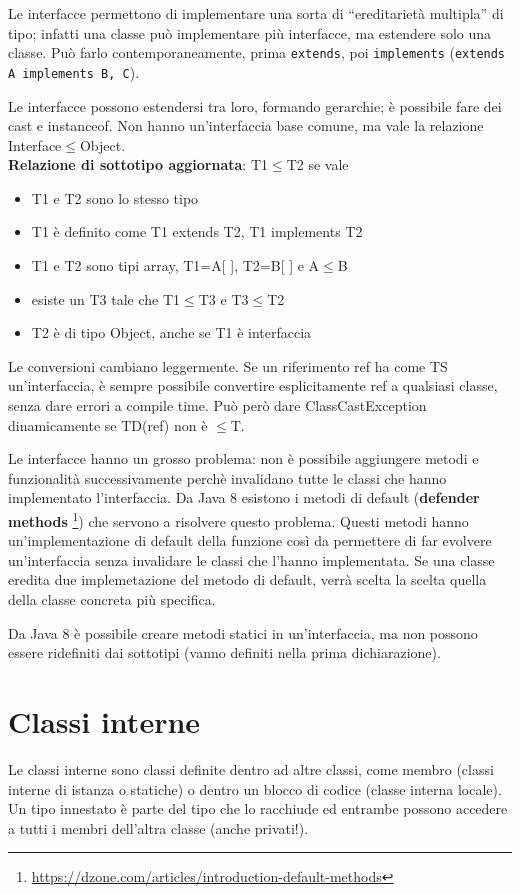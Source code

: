 Le interfacce permettono di implementare una sorta di “ereditarietà multipla” di tipo; infatti una classe può implementare più interfacce, ma estendere solo una classe. Può farlo contemporaneamente, prima \texttt{extends}, poi \texttt{implements} (\texttt{extends A implements B, C}).

Le interfacce possono estendersi tra loro, formando gerarchie; è possibile fare dei cast e instanceof. Non hanno un'interfaccia base comune, ma vale la relazione Interface$\le$Object. \\
\textbf{Relazione di sottotipo aggiornata}: T1$\le$T2 se vale
\begin{itemize}
\item T1 e T2 sono lo stesso tipo
\item T1 è definito come T1 extends T2, T1 implements T2
\item T1 e T2 sono tipi array, T1=A[ ], T2=B[ ] e A$\le$B
\item esiste un T3 tale che T1$\le$T3 e T3$\le$T2
\item T2 è di tipo Object, anche se T1 è interfaccia
\end{itemize}
Le conversioni cambiano leggermente. Se un riferimento ref ha come TS un'interfaccia, è sempre possibile convertire esplicitamente ref a qualsiasi classe, senza dare errori a compile time. Può però dare ClassCastException dinamicamente se TD(ref) non è $\le$T.

Le interfacce hanno un grosso problema: non è possibile aggiungere metodi e funzionalità successivamente perchè invalidano tutte le classi che hanno implementato l'interfaccia. Da Java 8 esistono i metodi di default (\textbf{defender methods} \footnote{\url{https://dzone.com/articles/introduction-default-methods}}) che servono a risolvere questo problema. Questi metodi hanno un'implementazione di default della funzione così da permettere di far evolvere un'interfaccia senza invalidare le classi che l'hanno implementata. Se una classe eredita due implemetazione del metodo di default, verrà scelta la scelta quella della classe concreta più specifica.

Da Java 8 è possibile creare metodi statici in un'interfaccia, ma non possono essere ridefiniti dai sottotipi (vanno definiti nella prima dichiarazione).

\section{Classi interne}
Le classi interne sono classi definite dentro ad altre classi, come membro (classi interne di istanza o statiche) o dentro un blocco di codice (classe interna locale). Un tipo innestato è parte del tipo che lo racchiude ed entrambe possono accedere a tutti i membri dell'altra classe (anche privati!).


